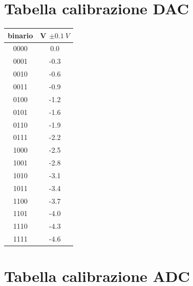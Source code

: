 \documentclass[journal]{IEEEtran}
\begin{document}
\begin{appendices}
\section{Tabella calibrazione DAC}

\centering
\begin{tabular}{cc}
binario & V $ \pm 0.1 \ V $ \\ \hline
0000    & 0.0                          \\
0001    & -0.3                       \\
0010    & -0.6                       \\
0011    & -0.9                       \\
0100    & -1.2                       \\
0101    & -1.6                       \\
0110    & -1.9                       \\
0111    & -2.2                       \\
1000    & -2.5                       \\
1001    & -2.8                       \\
1010    & -3.1                       \\
1011    & -3.4                       \\
1100    & -3.7                       \\
1101    & -4.0                       \\
1110    & -4.3                       \\
1111    & -4.6
\vspace{5 mm}
\label{tab:calibrazione_dac}
\end{tabular}


\section{Tabella calibrazione ADC}


\end{appendices}
\end{document}
